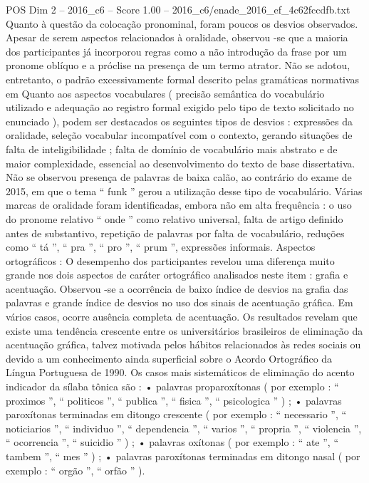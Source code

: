 \begin{textsample}{POS Dim 2 – 2016\_c6 – Score 1.00 – 2016\_c6/enade\_2016\_ef\_4c62fccdfb.txt}
Quanto à questão da colocação pronominal, foram poucos os desvios observados.
Apesar de serem aspectos relacionados à oralidade, observou -se que a maioria dos participantes já incorporou regras como a não introdução da frase por um pronome oblíquo e a próclise na presença de um termo atrator.
Não se adotou, entretanto, o padrão excessivamente formal descrito pelas gramáticas normativas em Quanto aos aspectos vocabulares ( precisão semântica do vocabulário utilizado e adequação ao registro formal exigido pelo tipo de texto solicitado no enunciado ), podem ser destacados os seguintes tipos de desvios : expressões da oralidade, seleção vocabular incompatível com o contexto, gerando situações de falta de inteligibilidade ; falta de domínio de vocabulário mais abstrato e de maior complexidade, essencial ao desenvolvimento do texto de base dissertativa.
Não se observou presença de palavras de baixa calão, ao contrário do exame de 2015, em que o tema “ funk ” gerou a utilização desse tipo de vocabulário.
Várias marcas de oralidade foram identificadas, embora não em alta frequência : o uso do pronome relativo “ onde ” como relativo universal, falta de artigo definido antes de substantivo, repetição de palavras por falta de vocabulário, reduções como “ tá ”, “ pra ”, “ pro ”, “ prum ”, expressões informais.
Aspectos ortográficos : O desempenho dos participantes revelou uma diferença muito grande nos dois aspectos de caráter ortográfico analisados neste item : grafia e acentuação.
Observou -se a ocorrência de baixo índice de desvios na grafia das palavras e grande índice de desvios no uso dos sinais de acentuação gráfica.
Em vários casos, ocorre ausência completa de acentuação.
Os resultados revelam que existe uma tendência crescente entre os universitários brasileiros de eliminação da acentuação gráfica, talvez motivada pelos hábitos relacionados às redes sociais ou devido a um conhecimento ainda superficial sobre o Acordo Ortográfico da Língua Portuguesa de 1990.
Os casos mais sistemáticos de eliminação do acento indicador da sílaba tônica são : • palavras proparoxítonas ( por exemplo : “ proximos ”, “ politicos ”, “ publica ”, “ fisica ”, “ psicologica ” ) ; • palavras paroxítonas terminadas em ditongo crescente ( por exemplo : “ necessario ”, “ noticiarios ”, “ individuo ”, “ dependencia ”, “ varios ”, “ propria ”, “ violencia ”, “ ocorrencia ”, “ suicidio ” ) ; • palavras oxítonas ( por exemplo : “ ate ”, “ tambem ”, “ mes ” ) ; • palavras paroxítonas terminadas em ditongo nasal ( por exemplo : “ orgão ”, “ orfão ” ).

\end{textsample}
